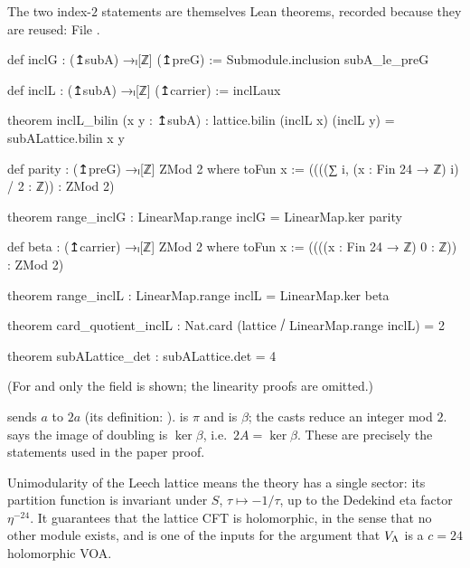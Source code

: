 The two index-$2$ statements are themselves Lean theorems, recorded because they are reused:
\noindent File .
\begin{leancode}
def inclG : (↥subA) →ₗ[ℤ] (↥preG) := Submodule.inclusion subA_le_preG

def inclL : (↥subA) →ₗ[ℤ] (↥carrier) := inclLaux

theorem inclL_bilin (x y : ↥subA) :
    lattice.bilin (inclL x) (inclL y) = subALattice.bilin x y

def parity : (↥preG) →ₗ[ℤ] ZMod 2 where
  toFun x := ((((∑ i, (x : Fin 24 → ℤ) i) / 2 : ℤ)) : ZMod 2)

theorem range_inclG : LinearMap.range inclG = LinearMap.ker parity

def beta : (↥carrier) →ₗ[ℤ] ZMod 2 where
  toFun x := ((((x : Fin 24 → ℤ) 0 : ℤ)) : ZMod 2)

theorem range_inclL : LinearMap.range inclL = LinearMap.ker beta

theorem card_quotient_inclL :
    Nat.card (lattice ⧸ LinearMap.range inclL) = 2

theorem subALattice_det : subALattice.det = 4
\end{leancode}
(For  and  only the  field is shown; the linearity proofs are omitted.)
\begin{dictionary}
 sends $a$ to $2a$ (its definition: ).
 is $\pi$ and  is $\beta$; the casts  reduce an
integer mod $2$.   says the image of doubling is $\ker\beta$, i.e.\ $2A=\ker\beta$.
These are precisely the statements used in the paper proof.
\end{dictionary}
\begin{physics}
Unimodularity of the Leech lattice means the theory has a single sector: its partition function is invariant under $S$, $\tau\mapsto-1/\tau$, up to the Dedekind eta factor $\eta^{-24}$. It guarantees that the lattice CFT is holomorphic, in the sense that no other module exists, and is one of the inputs for the argument that $V_{\Lambda}$ is a $c=24$ holomorphic VOA.
\end{physics}

